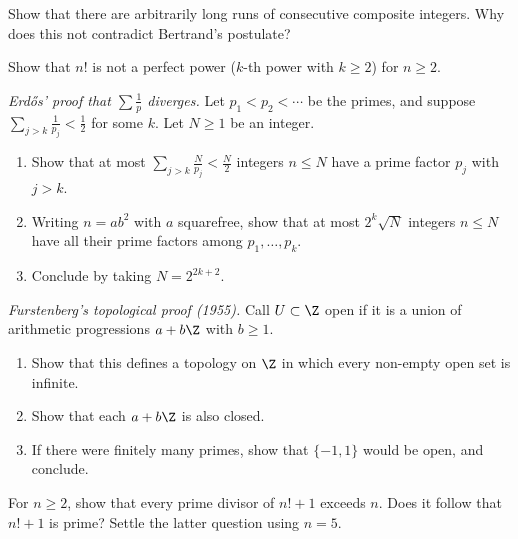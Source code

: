 \begin{exercise}[$\star\star$]\label{ex:gaps}
Show that there are arbitrarily long runs of consecutive composite integers. Why does this not contradict Bertrand's postulate?
\end{exercise}

\begin{exercise}[$\star\star$]\label{ex:factorial}
Show that $n!$ is not a perfect power ($k$-th power with $k\ge2$) for $n\ge2$.
\end{exercise}

\begin{exercise}[$\star\star\star$]\label{ex:erdosdiv}
\emph{Erd\H{o}s' proof that $\sum\frac1p$ diverges.} Let $p_1<p_2<\cdots$ be the primes, and suppose $\sum_{j>k}\frac1{p_j}<\frac12$ for some $k$. Let $N\ge1$ be an integer.
\begin{enumerate}[label=(\alph*)]
\item Show that at most $\sum_{j>k}\frac N{p_j}<\frac N2$ integers $n\le N$ have a prime factor $p_j$ with $j>k$.
\item Writing $n=ab^2$ with $a$ squarefree, show that at most $2^k\sqrt N$ integers $n\le N$ have all their prime factors among $p_1,\dots,p_k$.
\item Conclude by taking $N=2^{2k+2}$.
\end{enumerate}
\end{exercise}

\begin{exercise}[$\star\star\star$]\label{ex:furstenberg}
\emph{Furstenberg's topological proof (1955).} Call $U\subset\Z$ open if it is a union of arithmetic progressions $a+b\Z$ with $b\ge1$.
\begin{enumerate}[label=(\alph*)]
\item Show that this defines a topology on $\Z$ in which every non-empty open set is infinite.
\item Show that each $a+b\Z$ is also closed.
\item If there were finitely many primes, show that $\{-1,1\}$ would be open, and conclude.
\end{enumerate}
\end{exercise}

\begin{exercise}[$\star$]\label{ex:t1-factorial-new-prime}
For $n\ge2$, show that every prime divisor of $n!+1$ exceeds $n$. Does it follow that $n!+1$ is prime? Settle the latter question using $n=5$.
\end{exercise}

